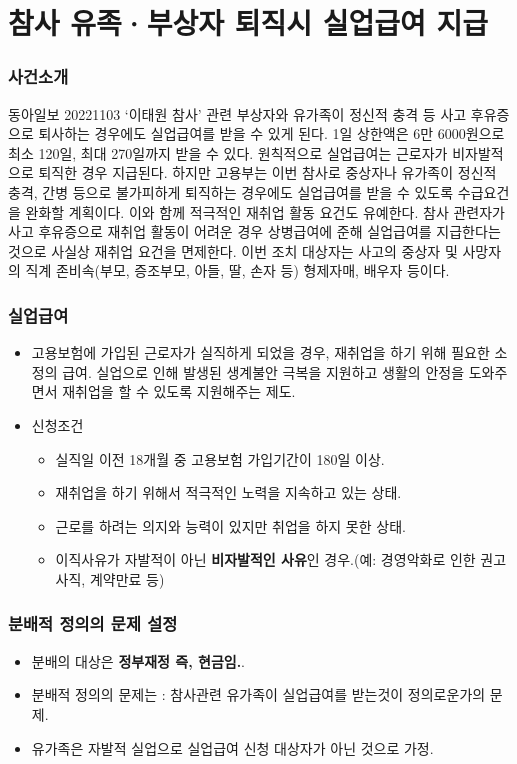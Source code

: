 \documentclass[aspectratio=169,xcolor=dvipsnames,]{beamer}
\begin{document}
\section{참사 유족·부상자 퇴직시 실업급여 지급}

\begin{frame}[<+->]
\frametitle{사건소개}
    \begin{exampleblock}{동아일보 20221103}
        ‘이태원 참사’ 관련 부상자와 유가족이 정신적 충격 등 사고 후유증으로 퇴사하는 경우에도 실업급여를 받을 수 있게 된다. 1일 상한액은 6만 6000원으로 최소 120일, 최대 270일까지 받을 수 있다. 원칙적으로 실업급여는 근로자가 비자발적으로 퇴직한 경우 지급된다.  하지만 고용부는 이번 참사로 중상자나 유가족이 정신적 충격, 간병 등으로 불가피하게 퇴직하는 경우에도 실업급여를 받을 수 있도록 수급요건을 완화할 계획이다.  이와 함께 적극적인 재취업 활동 요건도 유예한다. 참사 관련자가 사고 후유증으로 재취업 활동이 어려운 경우 상병급여에 준해 실업급여를 지급한다는 것으로 사실상 재취업 요건을 면제한다.  이번 조치 대상자는 사고의 중상자 및 사망자의 직계 존비속(부모, 증조부모, 아들, 딸, 손자 등) 형제자매, 배우자 등이다.
    \end{exampleblock}
\end{frame}

\begin{frame}[<+->]
\frametitle{실업급여}
    \begin{itemize}
        \item 고용보험에 가입된 근로자가 실직하게 되었을 경우, 재취업을 하기 위해 필요한 소정의 급여. 실업으로 인해 발생된 생계불안 극복을 지원하고 생활의 안정을 도와주면서 재취업을 할 수 있도록 지원해주는 제도.
        \item 신청조건
        \begin{itemize}
            \item 실직일 이전 18개월 중 고용보험 가입기간이 180일 이상.
            \item 재취업을 하기 위해서 적극적인 노력을 지속하고 있는 상태.
            \item 근로를 하려는 의지와 능력이 있지만 취업을 하지 못한 상태.
            \item 이직사유가 자발적이 아닌 \textbf{비자발적인 사유}인 경우.(예: 경영악화로 인한 권고사직, 계약만료 등)
        \end{itemize}

    \end{itemize}
\end{frame}

\begin{frame}[<+->]
\frametitle{분배적 정의의 문제 설정}
    \begin{itemize}
        \item 분배의 대상은 \textbf{정부재정 즉, 현금임.}.
        \item 분배적 정의의 문제는 : 참사관련 유가족이 실업급여를 받는것이 정의로운가의 문제.
        \item 유가족은 자발적 실업으로 실업급여 신청 대상자가 아닌 것으로 가정.
   \end{itemize}
\end{frame}
\end{document}
